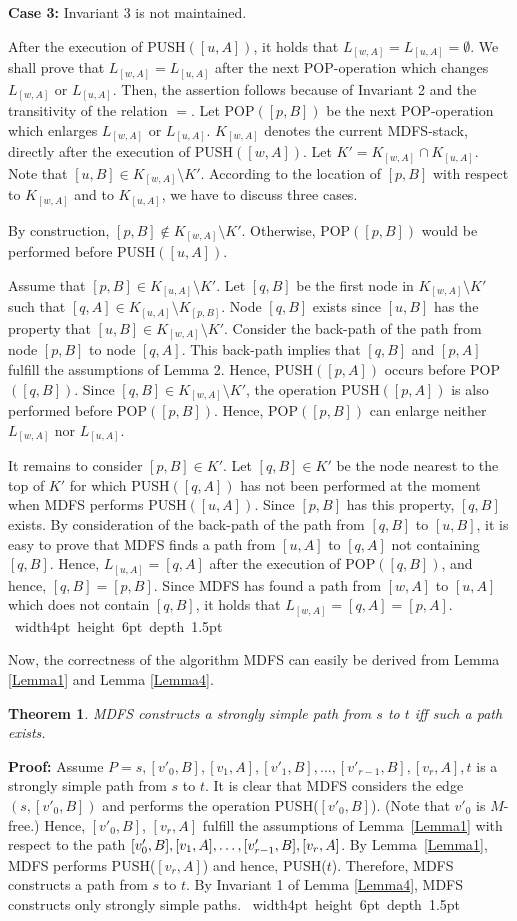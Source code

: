 \documentclass[12pt,twoside,a4paper]{article}
\def\QED{\hbox{\hskip 1pt \vrule width4pt height 6pt depth 1.5pt \hskip 1pt}}
\newtheorem{theo}{Theorem}
\begin{document}
\medskip
\noindent 
{\bf Case 3:} Invariant 3 is not maintained.

\medskip
After the execution of PUSH$([u,A])$, it holds that
$L_{[w,A]} = L_{[u,A]} = \emptyset$. 
We shall prove that $L_{[w,A]} = L_{[u,A]}$ after the next 
POP-operation which changes $L_{[w,A]}$ or $L_{[u,A]}$. Then, the assertion 
follows because of Invariant 2 and the transitivity of the relation $=$.
Let POP$([p,B])$ be the next POP-operation which enlarges $L_{[w,A]}$ or
$L_{[u,A]}$. $K_{[w,A]}$ denotes the current MDFS-stack, directly after the 
execution of PUSH$([w,A])$. Let $K' = K_{[w,A]} \cap K_{[u,A]}$.
Note that $[u,B] \in K_{[w,A]} \setminus K'$.
According to the location of $[p,B]$ with respect to $K_{[w,A]}$ and to
$K_{[u,A]}$, we have to discuss three cases.

By construction, $[p,B] \not\in K_{[w,A]} \setminus K'$. Otherwise, 
POP$([p,B])$ would be performed before PUSH$([u,A])$.

Assume that $[p,B] \in K_{[u,A]} \setminus K'$. Let $[q,B]$ be the first node 
in $K_{[w,A]} \setminus K'$ such that 
$[q,A] \in K_{[u,A]} \setminus K_{[p,B]}$. Node $[q,B]$ exists since $[u,B]$
has the property that $[u,B] \in K_{[w,A]} \setminus K'$.
Consider the back-path of the path from node $[p,B]$ to node $[q,A]$. This 
back-path implies that $[q,B]$ and $[p,A]$ fulfill the assumptions of
Lemma 2. Hence, PUSH$([p,A])$ occurs before POP$([q,B])$. Since $[q,B] \in
K_{[w,A]} \setminus K'$, the operation PUSH$([p,A])$ is also performed before
POP$([p,B])$. Hence, POP$([p,B])$ can enlarge neither $L_{[w,A]}$ nor
$L_{[u,A]}$. 

It remains to consider $[p,B] \in K'$. Let $[q,B] \in K'$ be the node 
nearest to the top of $K'$ for which PUSH$([q,A])$ has not been performed at 
the moment when MDFS performs PUSH$([u,A])$. Since $[p,B]$ has this property,
$[q,B]$ exists.
By consideration of the back-path of the path from $[q,B]$ to $[u,B]$, 
it is easy to prove that MDFS finds a path from $[u,A]$ to $[q,A]$
not containing $[q,B]$. Hence, $L_{[u,A]} = [q,A]$ after the 
execution of POP$([q,B])$, and hence, 
$[q,B] = [p,B]$. Since MDFS has found a path from $[w,A]$ to $[u,A]$ which 
does not contain $[q,B]$, it holds that $L_{[w,A]} = [q,A] = [p,A]$.  
\QED

\medskip
Now, the correctness of the algorithm MDFS can easily be derived from Lemma \ref{Lemma1}
and Lemma \ref{Lemma4}.
\begin{theo}
MDFS constructs a strongly simple path from $s$ to $t$ iff such a path exists.
\end{theo}
{\bf Proof:}
Assume $P=s,[v'_0,B],[v_1,A],[v'_1,B],\ldots,[v'_{r-1},B],[v_r,A],t$ is a strongly simple path 
from $s$ to $t$. It is clear that MDFS considers the
edge $(s,[v'_0,B])$ and performs the operation PUSH($[v'_0,B]$). (Note that 
$v'_0$ is $M$-free.)
Hence, $[v'_0,B]$, $[v_r,A]$ fulfill the assumptions of Lemma~\ref{Lemma1}
with respect to the path $[v'_0,B],[v_1,A],\ldots,[v'_{r-1},B],\linebreak[0]
[v_r,A]$.
By Lemma~\ref{Lemma1}, MDFS performs PUSH($[v_r,A]$) and hence, 
PUSH($t$). Therefore, MDFS constructs a path from $s$ to $t$.
By Invariant 1 of Lemma \ref{Lemma4}, MDFS constructs only strongly simple paths.
\QED
\end{document}
